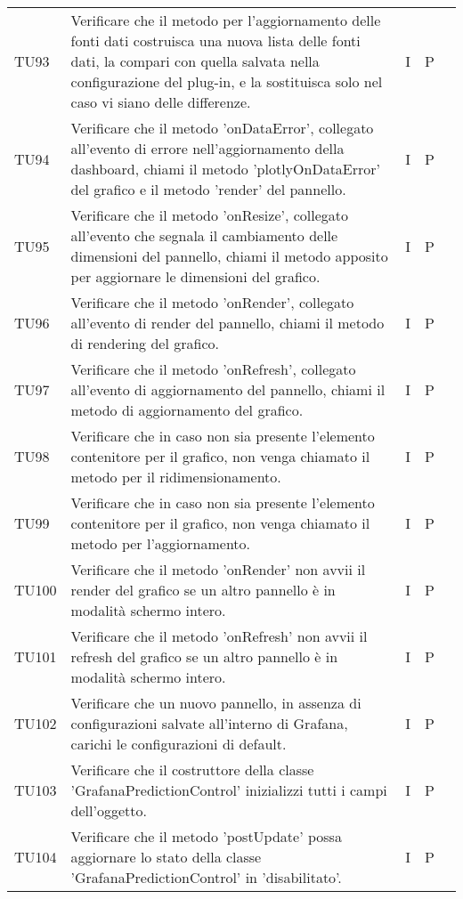 \begin{longtable} {
		>{}p{15mm} 
		>{}p{79.5mm}
		>{}p{15mm} 
		>{}p{15mm}
		>{}p{0mm}}
	TU93		& Verificare che il metodo per l'aggiornamento delle fonti dati costruisca una nuova lista delle fonti dati, la compari con quella salvata nella configurazione del plug-in, e la sostituisca solo nel caso vi siano delle differenze. & I & P &\TBstrut \\ [2mm]
	TU94		& Verificare che il metodo 'onDataError', collegato all'evento di errore nell'aggiornamento della dashboard, chiami il metodo 'plotlyOnDataError' del grafico e il metodo 'render' del pannello.& I & P &\TBstrut \\ [2mm]
	TU95		& Verificare che il metodo 'onResize', collegato all'evento che segnala il cambiamento delle dimensioni del pannello, chiami il metodo apposito per aggiornare le dimensioni del grafico.& I & P &\TBstrut \\ [2mm]
	TU96		& Verificare che il metodo 'onRender', collegato all'evento di render del pannello, chiami il metodo di rendering del grafico.& I & P &\TBstrut \\ [2mm]
	TU97		& Verificare che il metodo 'onRefresh', collegato all'evento di aggiornamento del pannello, chiami il metodo di aggiornamento del grafico.& I & P &\TBstrut \\ [2mm]
	TU98		& Verificare che in caso non sia presente l'elemento contenitore per il grafico, non venga chiamato il metodo per il ridimensionamento.& I & P &\TBstrut \\ [2mm]
	TU99		& Verificare che in caso non sia presente l'elemento contenitore per il grafico, non venga chiamato il metodo per l'aggiornamento.& I & P &\TBstrut \\ [2mm]
	TU100		& Verificare che il metodo 'onRender' non avvii il render del grafico se un altro pannello è in modalità schermo intero.& I & P &\TBstrut \\ [2mm]
	TU101		& Verificare che il metodo 'onRefresh' non avvii il refresh del grafico se un altro pannello è in modalità schermo intero.& I & P &\TBstrut \\ [2mm]
	TU102		& Verificare che un nuovo pannello, in assenza di configurazioni salvate all'interno di Grafana, carichi le configurazioni di default.& I & P &\TBstrut \\ [2mm]
	TU103		& Verificare che il costruttore della classe 'GrafanaPredictionControl' inizializzi tutti i campi dell'oggetto.& I & P &\TBstrut \\ [2mm]
	TU104		& Verificare che il metodo 'postUpdate' possa aggiornare lo stato della classe 'GrafanaPredictionControl' in 'disabilitato'.& I & P &\TBstrut \\ [2mm]

\end{longtable}
